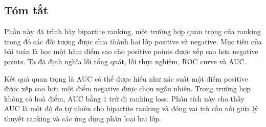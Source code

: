 \subsection{Tóm tắt}

Phần này đã trình bày bipartite ranking, một trường hợp quan trọng của ranking trong đó các đối tượng được chia thành hai lớp positive và negative. Mục tiêu của bài toán là học một hàm điểm sao cho positive points được xếp cao hơn negative points. Ta đã định nghĩa lỗi tổng quát, lỗi thực nghiệm, ROC curve và AUC.

Kết quả quan trọng là AUC có thể được hiểu như xác suất một điểm positive được xếp cao hơn một điểm negative được chọn ngẫu nhiên. Trong trường hợp không có hoà điểm, AUC bằng \(1\) trừ đi ranking loss. Phân tích này cho thấy AUC là một độ đo tự nhiên cho bipartite ranking và đóng vai trò cầu nối giữa lý thuyết ranking và các ứng dụng phân loại hai lớp.